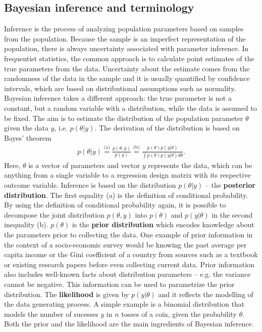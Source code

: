 \subsection{Bayesian inference and terminology}

Inference is the process of analyzing population parameters based on samples from the population.
Because the sample is an imperfect representation of the population, there is always uncertainty associated with parameter inference.
In frequentist statistics, the common approach is to calculate point estimates of the true parameters from the data.
Uncertainty about the estimate comes from the randomness of the data in the sample and it is usually quantified by confidence intervals, which are based on distributional assumptions such as normality.
Bayesian inference takes a different approach: the true parameter is not a constant, but a random variable with a distribution, while the data is assumed to be fixed.
The aim is to estimate the distribution of the population parameter $\theta$ given the data $y$, i.e. $p(\theta|y)$.
The derivation of the distribution is based on Bayes' theorem
\begin{gather*}
	\displaystyle p(\theta | y) \overset {\text{(a)}}{=}  \frac {p(\theta, y)}{p(y)} \overset {\text{(b)}}{=} \frac {p(\theta) p(y|\theta)}{\int p(\theta) p(y|\theta)d\theta}.
\end{gather*}
Here, $\theta$ is a vector of parameters and vector $y$ represents the data, which can be anything from a single variable to a regression design matrix with its respective outcome variable.
Inference is based on the distribution $p(\theta | y )$ – the \textbf{posterior distribution}.
The first equality (a) is the definition of conditional probability.
By using the definition of conditional probability again, it is possible to decompose the joint distribution $p(\theta, y)$ into $p(\theta)$ and $p(y|\theta)$ in the second inequality (b).
$p(\theta)$ is the \textbf{prior distribution} which encodes knowledge about the parameters prior to collecting the data. One example of prior information in the context of a socio-economic survey would be knowing the past average per capita income or the Gini coefficient of a country from sources such as a textbook or existing research papers before even collecting current data.
Prior information also includes well-known facts about distribution parameters – e.g. the variance cannot be negative.
This information can be used to parametrize the prior distribution.
The \textbf{likelihood} is given by $p(y | \theta)$ and it reflects the modelling of the data generating process.
A simple example is a binomial distribution that models the number of sucesses $y$ in $n$ tosses of a coin, given the probability $\theta$.
Both the prior and the likelihood are the main ingredients of Bayesian inference.

